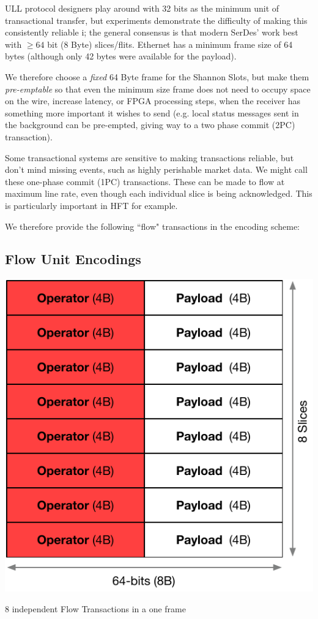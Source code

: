 \documentclass[../OAE-SPEC-MAIN.tex]{subfiles}
\begin{document}
ULL protocol designers play around with 32 bits as the minimum unit of transactional transfer, but experiments demonstrate the difficulty of making this consistently reliable i; the general consensus is that modern SerDes' work best with $\ge 64$ bit (8 Byte) slices/flits.
Ethernet  has a minimum frame size of 64 bytes  (although only 42 bytes were available for the payload).

We therefore choose a \emph{fixed} 64 Byte frame for the Shannon Slots, but make them \emph{pre-emptable} so that even the minimum size frame does not need to occupy space on the wire, increase latency, or FPGA processing steps, when the receiver has something more important it wishes to send (e.g. local status messages sent in the background can be pre-empted, giving way to a two phase commit (2PC) transaction).



Some transactional systems are sensitive to making transactions reliable, but don't mind missing events, such as highly perishable market data.  We might call these one-phase commit (1PC) transactions. These can be made to flow at maximum line rate, even though each individual slice is being acknowledged. This is particularly important in HFT for example.

We therefore provide the following ``flow" transactions in the encoding scheme:




\subsection{Flow Unit Encodings}

\begin{marginfigure}[-10mm]
  \includegraphics[width=\linewidth]{./figures/8-slices.pdf}
  \caption{8 independent Flow Transactions in a one frame}
  \vspace{8pt}
\end{marginfigure}
\end{document}

